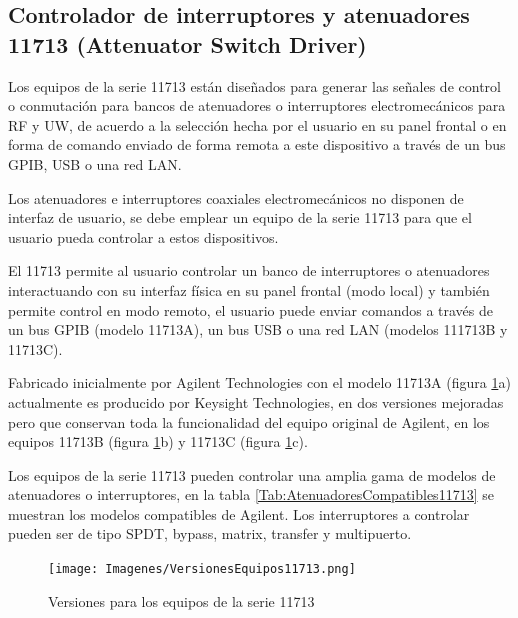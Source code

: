 		\subsection{Controlador de interruptores y atenuadores 11713 (Attenuator Switch Driver)}
Los equipos de la serie 11713 están diseñados para generar las señales de control o conmutación para  bancos de	atenuadores o interruptores electromecánicos para RF y UW, de acuerdo a la selección hecha por el usuario en su panel frontal o en forma de comando enviado de forma remota a este dispositivo a través de un bus GPIB, USB o una red LAN.

Los atenuadores e interruptores coaxiales electromecánicos no disponen de interfaz de usuario, se debe emplear un	equipo de la serie 11713 para que el usuario pueda controlar a estos dispositivos.

El 11713 permite al usuario controlar un banco de interruptores o atenuadores interactuando con su interfaz física en su panel frontal (modo local) y también permite control en modo remoto, el usuario puede enviar comandos a través de un bus GPIB (modelo 11713A), un bus USB o una red LAN (modelos 111713B y 11713C).

Fabricado inicialmente por Agilent Technologies con el modelo 11713A (figura \ref{Fig:Versiones11713}a) actualmente es producido por Keysight Technologies, en dos versiones mejoradas pero que conservan toda la funcionalidad del equipo original de Agilent, en los equipos 11713B (figura \ref{Fig:Versiones11713}b) y 11713C (figura \ref{Fig:Versiones11713}c).

Los equipos de la serie 11713 pueden controlar una amplia gama de modelos de atenuadores o interruptores, en la tabla \ref{Tab:AtenuadoresCompatibles11713} se muestran los modelos compatibles de Agilent. Los interruptores a controlar pueden ser de tipo SPDT, bypass, matrix, transfer y multipuerto.

\begin{figure}
	\centering
	\begin{minipage}{17.552cm}
		\texttt{[image: Imagenes/VersionesEquipos11713.png]}
		\caption{Versiones para los	equipos de la serie 11713}
		\label{Fig:Versiones11713} 
	\end{minipage}
\end{figure}

